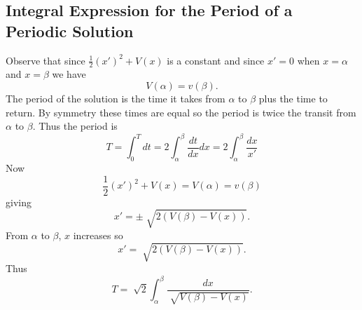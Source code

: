 \subsection*{Integral Expression for the Period of a Periodic Solution}
Observe that since $\frac{1}{2}(x')^2+V(x)$ is a constant and since $x'=0$ when $x=\alpha$ and $x=\beta$ we have $$V(\alpha)=v(\beta).$$ The period of the solution is the time it takes from $\alpha$ to $\beta$ plus the time to return. By symmetry these times are equal so the period is twice the transit from $\alpha$ to $\beta.$ Thus the period is $$T= \int_0^T dt = 2\int_\alpha^\beta\frac{dt}{dx}dx = 2\int_\alpha^\beta \frac{dx}{x'}$$ Now $$\frac{1}{2}(x')^2 +V(x) = V(\alpha)=v(\beta)$$ giving $$x' = \pm \sqrt[]{2(V(\beta)-V(x))}.$$ From $\alpha$ to $\beta$, $x$ increases so $$x' = \sqrt[]{2(V(\beta)-V(x))}.$$ Thus $$T = \sqrt[]{2}\int_\alpha^\beta\frac{dx}{\sqrt[]{V(\beta)-V(x)}}.$$


\endinput
